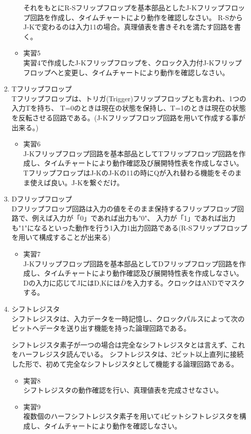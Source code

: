 \documentclass[dvipdfmx]{jsarticle}
\begin{document}
\begin{enumerate}
\begin{itemize}
						それをもとにR-Sフリップフロップを基本部品としたJ-Kフリップフロップ回路を作成し、タイムチャートにより動作を確認しなさい。
						R-SからJ-Kで変わるのは入力11の場合。真理値表を書きそれを満たす回路を書く。
					\item 実習5 \\
						実習4で作成したJ-Kフリップフロップを、クロック入力付J-Kフリップフロップへと変更し、タイムチャートにより動作を確認しなさい。
				\end{itemize}
			\item Tフリップフロップ \\
				Tフリップフロップは、トリガ(Trigger)フリップフロップとも言われ、1つの入力Tを持ち、
				T=0のときは現在の状態を保持し、T=1のときは現在の状態を反転させる回路である。(J-Kフリップフロップ回路を用いて作成する事が出来る。)
				\begin{itemize}
					\item 実習6 \\
						J-Kフリップフロップ回路を基本部品としてTフリップフロップ回路を作成し、タイムチャートにより動作確認及び展開特性表を作成しなさい。
						TフリップフロップはJ-KのJ-Kの11の時にQが入れ替わる機能をそのまま使えば良い。J-Kを繋ぐだけ。
				\end{itemize}
			\item Dフリップフロップ \\
				Dフリップフロップ回路は入力の値をそのまま保持するフリップフロップ回路で、例えば入力が「0」であれば出力も"0"、
				入力が「1」であれば出力も"1"になるといった動作を行う1入力1出力回路である(R-Sフリップフロップを用いて構成することが出来る)
				\begin{itemize}
					\item 実習7 \\
					J-Kフリップフロップ回路を基本部品としてDフリップフロップ回路を作成し、タイムチャートにより動作確認及び展開特性表を作成しなさい。
					Dの入力に応じてJにはD,Kには$\bar{D}$を入力する。クロックはANDでマスクする。
				\end{itemize}
			\item シフトレジスタ \\
				シフトレジスタは、入力データを一時記憶し、クロックパルスによって次のビットへデータを送り出す機能を持った論理回路である。\par
				シフトレジスタ素子が一つの場合は完全なシフトレジスタとは言えず、これをハーフレジスタ読んでいる。
				シフトレジスタは、2ビット以上直列に接続した形で、初めて完全なシフトレジスタとして機能する論理回路である。
				\begin{itemize}
					\item 実習8 \\
						シフトレジスタの動作確認を行い、真理値表を完成させなさい。
					\item 実習9 \\
						複数個のハーフシフトレジスタ素子を用いて4ビットシフトレジスタを構成し、タイムチャートにより動作を確認しなさい。
				\end{itemize}
		\end{enumerate}
\end{document}
